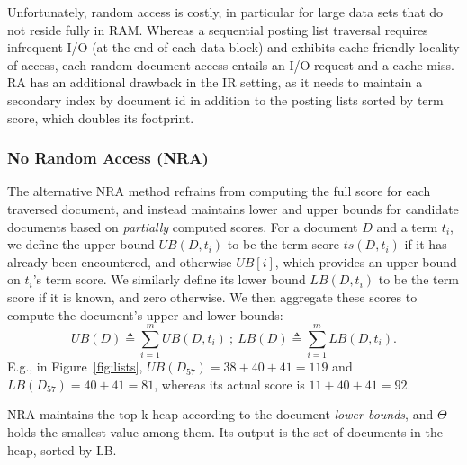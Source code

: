 Unfortunately, random access is costly,  in particular for large data sets that do not reside fully in RAM.
Whereas a sequential posting list traversal requires infrequent I/O (at the end of each data block) and exhibits cache-friendly locality of access,  each random document access entails an I/O request and a cache miss.  
RA has an additional drawback in the IR setting, as it needs to maintain a secondary index by document id in addition to the posting lists sorted by term score, which doubles its footprint. 

\subsubsection{No Random Access (NRA)} 
The alternative NRA method %
refrains from computing the full score for each traversed document, and instead
maintains lower and upper bounds for candidate documents based on {\em partially\/} computed scores. 
For a document $D$ and a term $t_i$, we define the upper bound $UB(D, t_i)$ to be the term score $ts(D, t_i)$ if it has already been encountered, and otherwise $UB[i]$, which provides an upper bound on $t_i$'s term score. We similarly define its lower bound $LB(D, t_i)$ to be the term score if it is known, and zero otherwise. We then aggregate these scores to compute the document's upper and lower bounds:
\[
UB(D) \triangleq \sum_{i=1}^m UB(D, t_i) \ ; \  
LB(D) \triangleq \sum_{i=1}^m LB(D, t_i).
\] 
E.g., in Figure~\ref{fig:lists}, $UB(D_{57}) = 38+40+41 = 119$ and $LB(D_{57}) = 40+41 = 81$, whereas its actual score  is $11+ 40+41 = 92$.

NRA maintains the top-k heap according to the document \emph{lower bounds}, and $\Theta$ holds the smallest value among them. 
Its output is the set of documents in the heap, sorted by LB.

